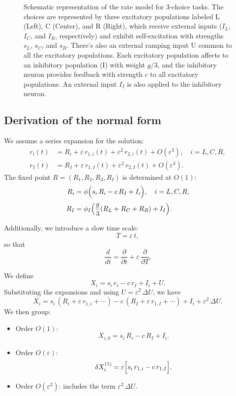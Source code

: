 \documentclass[ENG]{fancynotes}
\begin{document}
\begin{figure}[H]
\begin{tikzpicture}[>=Stealth,
  neuron/.style={draw, circle, minimum size=2.0cm, inner sep=4pt, font=\Large},
  arrowlabel/.style={draw=none, fill=none, font=\Large}]
\end{tikzpicture}
\caption{Schematic representation of the rate model for 3-choice tasks. The choices are represented by three excitatory populations labeled L (Left), C (Center), and R (Right), which receive external inputs ($I_L$, $I_C$, and $I_R$, respectively) and exhibit self-excitation with strengths $s_L$, $s_C$, and $s_R$. There's also an external ramping input U common to all the excitatory populations. Each excitatory population affects to an inhibitory population (I) with weight $g/3$, and the inhibitory neuron provides feedback with strength $c$ to all excitatory populations. An external input $I_I$ is also applied to the inhibitory neuron.}
\label{fig:model-rates}
\end{figure}
\newpage


\subsection{Derivation of the normal form}

We assume a series expansion for the solution:
\begin{align}
  r_i(t) &= R_i + \varepsilon\,r_{1,i}(t) + \varepsilon^2\,r_{2,i}(t) + O(\varepsilon^3), \quad i=L,C,R, \label{eq:exp_ex}\\[1mm]
  r_I(t) &= R_I + \varepsilon\,r_{1,I}(t) + \varepsilon^2\,r_{2,I}(t) + O(\varepsilon^3). \label{eq:exp_inh}
\end{align}
The fixed point \(R=(R_1,R_2,R_3,R_I)\) is determined at \(O(1)\):
\begin{align}
  R_i &= \phi\Bigl(s_i\,R_i - c\,R_I + I_i \Bigr), \quad i=L,C,R, \label{eq:fixed_ex}\\[1mm]
  R_I &= \phi_I\Bigl(\frac{g}{3}(R_L+R_C+R_R)+I_I\Bigr). \label{eq:fixed_inh}
\end{align}

Additionally, we introduce a slow time scale:
\[
T = \varepsilon\,t,
\]
so that
\[
\frac{d}{dt} = \frac{\partial}{\partial t} + \varepsilon\,\frac{\partial}{\partial T}.
\]


We define
\begin{equation}
  X_i = s_i\,r_i - c\,r_I + I_i + U.
  \label{eq:argument}
\end{equation}
Substituting the expansions and using \(U =  \varepsilon^2\,\Delta U\), we have
\[
X_i = s_i\,(R_i + \varepsilon\,r_{1,i} + \cdots) - c\,(R_I + \varepsilon\,r_{1,I}+\cdots) + I_i + \varepsilon^2\,\Delta U.
\]
We then group:
\begin{itemize}
  \item Order \(O(1)\):
    \[
    X_{i,0} = s_i\,R_i - c\,R_I + I_i .
    \]
  \item Order \(O(\varepsilon)\):
    \[
    \delta X_i^{(1)} = \varepsilon\Bigl[s_i\,r_{1,i} - c\,r_{1,I}\Bigr].
    \]
  \item Order \(O(\varepsilon^2)\): includes the term \(\varepsilon^2\,\Delta U\).
\end{itemize}
\end{document}
